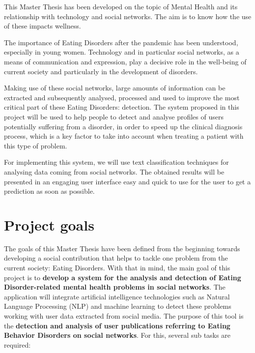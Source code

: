 

This Master Thesis has been developed on the topic of Mental Health and its relationship with technology and social networks. The aim is to know how the use of these impacts wellness. 


The importance of Eating Disorders after the pandemic has been understood, especially in young women. Technology and in particular social networks, as a means of communication and expression, play a decisive role in the well-being of current society and particularly in the development of disorders.

Making use of these social networks, large amounts of information can be extracted and subsequently analysed, processed and used to improve the most critical part of these Eating Disorders: detection. The system proposed in this project will be used to help people to detect and analyse profiles of users potentially suffering from a disorder, in order to speed up the clinical diagnosis process, which is a key factor to take into account when treating a patient with this type of problem.

For implementing this system, we will use text classification techniques for analysing data coming from social networks. The obtained results will be presented in an engaging user interface easy and quick to use for the user to get a prediction as soon as possible.


\section{Project goals}
\label{sec:goals}
The goals of this Master Thesis have been defined from the beginning towards developing a social contribution that helps to tackle one problem from the current society: Eating Disorders. With that in mind, the main goal of this project is to \textbf{develop a system for the analysis and detection of Eating Disorder-related mental health problems in social networks}. The application will integrate artificial intelligence technologies such as Natural Language Processing (NLP) and machine learning to detect these problems working with user data extracted from social media. The purpose of this tool is the \textbf{detection and analysis of user publications referring to Eating Behavior Disorders on social networks}. For this, several sub tasks are required:

